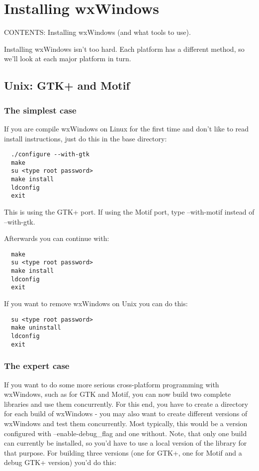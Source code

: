 \chapter{Installing wxWindows}\label{chapinstall}
%
%
\setfooter{\thepage}{}{}{}{}{\thepage}%

CONTENTS: Installing wxWindows (and what tools to use).

Installing wxWindows isn't too hard. Each platform has a different method, so we'll look
at each major platform in turn.

\section{Unix: GTK+ and Motif}\label{installunix}

\subsection{The simplest case}

If you are compile wxWindows on Linux for the first time and don't like to read 
install instructions, just do this in the base directory:

\begin{verbatim}
  ./configure --with-gtk
  make
  su <type root password>
  make install
  ldconfig
  exit
\end{verbatim}

This is using the GTK+ port. If using the Motif port, type --with-motif instead of --with-gtk.

Afterwards you can continue with:

\begin{verbatim}
  make
  su <type root password>
  make install
  ldconfig
  exit
\end{verbatim}

If you want to remove wxWindows on Unix you can do this:

\begin{verbatim}
  su <type root password>
  make uninstall
  ldconfig
  exit
\end{verbatim}

\subsection{The expert case}

If you want to do some more serious cross-platform programming with wxWindows, 
such as for GTK and Motif, you can now build two complete libraries and use 
them concurrently. For this end, you have to create a directory for each build 
of wxWindows - you may also want to create different versions of wxWindows
and test them concurrently. Most typically, this would be a version configured 
with --enable-debug\_flag and one without. Note, that only one build can currently 
be installed, so you'd have to use a local version of the library for that purpose.
For building three versions (one for GTK+, one for Motif and a debug GTK+ version) you'd do this:

